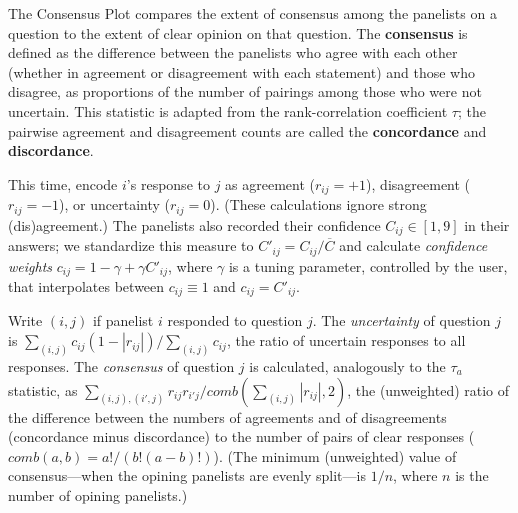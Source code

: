 \documentclass{article}
\begin{document}
The Consensus Plot compares the extent of consensus among the panelists on a question to the extent of clear opinion on that question. The {\bf consensus} is defined as the difference between the panelists who agree with each other (whether in agreement or disagreement with each statement) and those who disagree, as proportions of the number of pairings among those who were not uncertain. This statistic is adapted from the rank-correlation coefficient \(\tau\); the pairwise agreement and disagreement counts are called the {\bf concordance} and {\bf discordance}.

This time, encode \(i\)'s response to \(j\) as agreement (\(r_{ij}=+1\)), disagreement (\(r_{ij}=-1\)), or uncertainty (\(r_{ij}=0\)). (These calculations ignore strong (dis)agreement.) The panelists also recorded their confidence \(C_{ij}\in[1,9]\) in their answers; we standardize this measure to \(C'_{ij}=C_{ij}/\overline{C}\) and calculate {\em confidence weights} \(c_{ij}=1-\gamma+\gamma C'_{ij}\), where \(\gamma\) is a tuning parameter, controlled by the user, that interpolates between \(c_{ij}\equiv 1\) and \(c_{ij}=C'_{ij}\).

Write \((i,j)\) if panelist \(i\) responded to question \(j\). The {\em uncertainty} of question \(j\) is \(\sum_{(i,j)}{c_{ij}(1-|r_{ij}|)}/\sum_{(i,j)}{c_{ij}}\), the ratio of uncertain responses to all responses. The {\em consensus} of question \(j\) is calculated, analogously to the \(\tau_a\) statistic, as \(\sum_{(i,j),(i',j)}{r_{ij}r_{i'j}}/{comb(\sum_{(i,j)}{|r_{ij}|},2)}\), the (unweighted) ratio of the difference between the numbers of agreements and of disagreements (concordance minus discordance) to the number of pairs of clear responses (\(comb(a,b)=a!/(b!(a-b)!)\)). (The minimum (unweighted) value of consensus---when the opining panelists are evenly split---is \(1/n\), where \(n\) is the number of opining panelists.)
\end{document}
